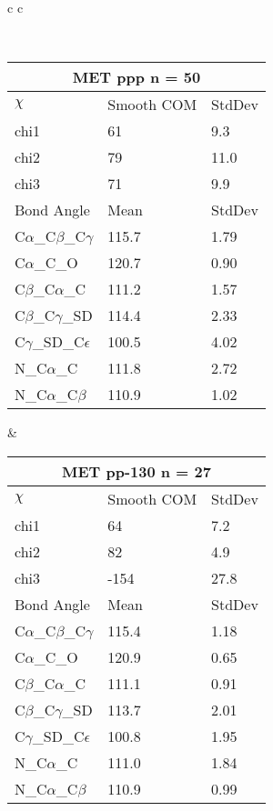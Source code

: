 \begin{longtable}{ c c }

\caption{MET Central Values}\\
  \begin{tabular}{ l l l }
  \toprule
  \multicolumn{3}{c}{MET \textbf{ppp} n = 50} \\ \toprule
  $\chi$       & Smooth COM & StdDev \\ \midrule
  chi1 & 61 & 9.3 \\ 
  chi2 & 79 & 11.0 \\ 
  chi3 & 71 & 9.9 \\ \midrule
  Bond Angle   & Mean     & StdDev \\ \midrule
  C$\alpha$\_C$\beta$\_C$\gamma$ & 115.7 & 1.79\\
  C$\alpha$\_C\_O & 120.7 & 0.90\\
  C$\beta$\_C$\alpha$\_C & 111.2 & 1.57\\
  C$\beta$\_C$\gamma$\_SD & 114.4 & 2.33\\
  C$\gamma$\_SD\_C$\epsilon$ & 100.5 & 4.02\\
  N\_C$\alpha$\_C & 111.8 & 2.72\\
  N\_C$\alpha$\_C$\beta$ & 110.9 & 1.02\\
  \bottomrule
  \end{tabular}
  &
  \begin{tabular}{ l l l }
  \toprule
  \multicolumn{3}{c}{MET \textbf{pp-130} n = 27} \\ \toprule
  $\chi$       & Smooth COM & StdDev \\ \midrule
  chi1 & 64 & 7.2 \\ 
  chi2 & 82 & 4.9 \\ 
  chi3 & -154 & 27.8 \\ \midrule
  Bond Angle   & Mean     & StdDev \\ \midrule
  C$\alpha$\_C$\beta$\_C$\gamma$ & 115.4 & 1.18\\
  C$\alpha$\_C\_O & 120.9 & 0.65\\
  C$\beta$\_C$\alpha$\_C & 111.1 & 0.91\\
  C$\beta$\_C$\gamma$\_SD & 113.7 & 2.01\\
  C$\gamma$\_SD\_C$\epsilon$ & 100.8 & 1.95\\
  N\_C$\alpha$\_C & 111.0 & 1.84\\
  N\_C$\alpha$\_C$\beta$ & 110.9 & 0.99\\
  \bottomrule
  \end{tabular}
  \\

\end{longtable}
